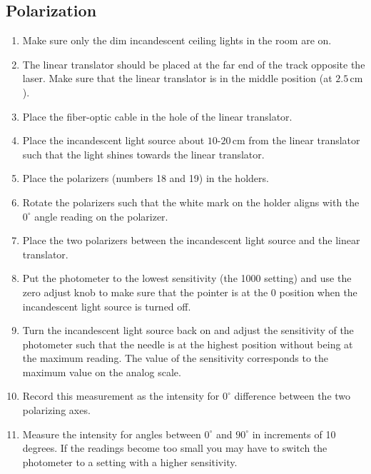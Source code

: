 \subsection{Polarization}
\begin{enumerate}
\item Make sure only the dim incandescent ceiling lights in the room are on.

\item The linear translator should be placed at the far end of the track opposite the laser. Make sure that the linear translator is in the middle position (at $2.5\,\mathrm{cm}$).

\item Place the fiber-optic cable in the hole of the linear translator.

\item Place the incandescent light source about $10$-$20\,\mathrm{cm}$ from the linear translator such that the light shines towards the linear translator.

\item Place the polarizers (numbers 18 and 19) in the holders.

\item Rotate the polarizers such that the white mark on the holder aligns with the $0^{\circ}$ angle reading on the polarizer.

\item Place the two polarizers between the incandescent light source and the linear translator.

\item Put the photometer to the lowest sensitivity (the 1000 setting) and use the zero adjust knob to make sure that the pointer is at the 0 position when the incandescent light source is turned off.

\item Turn the incandescent light source back on and adjust the sensitivity of the photometer such that the needle is at the highest position without being at the maximum reading. The value of the sensitivity corresponds to the maximum value on the analog scale.

\item Record this measurement as the intensity for $0^{\circ}$ difference between the two polarizing axes.

\item Measure the intensity for angles between $0^{\circ}$ and $90^{\circ}$ in increments of 10 degrees. If the readings become too small you may have to switch the photometer to a setting with a higher sensitivity.


\end{enumerate}

